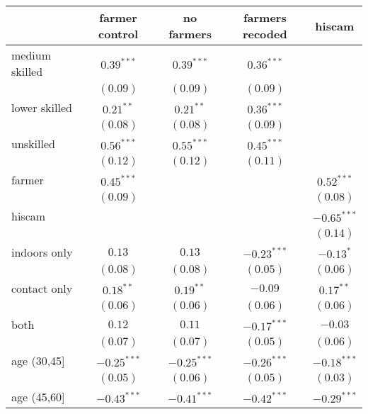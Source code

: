 
\begin{table}
\begin{center}
\begin{tabular}{l c c c c}
\hline
 & farmer control & no farmers & farmers recoded & hiscam \\
\hline
medium skilled & $0.39^{***}$  & $0.39^{***}$  & $0.36^{***}$  &               \\
               & $(0.09)$      & $(0.09)$      & $(0.09)$      &               \\
lower skilled  & $0.21^{**}$   & $0.21^{**}$   & $0.36^{***}$  &               \\
               & $(0.08)$      & $(0.08)$      & $(0.09)$      &               \\
unskilled      & $0.56^{***}$  & $0.55^{***}$  & $0.45^{***}$  &               \\
               & $(0.12)$      & $(0.12)$      & $(0.11)$      &               \\
farmer         & $0.45^{***}$  &               &               & $0.52^{***}$  \\
               & $(0.09)$      &               &               & $(0.08)$      \\
hiscam         &               &               &               & $-0.65^{***}$ \\
               &               &               &               & $(0.14)$      \\
indoors only   & $0.13$        & $0.13$        & $-0.23^{***}$ & $-0.13^{*}$   \\
               & $(0.08)$      & $(0.08)$      & $(0.05)$      & $(0.06)$      \\
contact only   & $0.18^{**}$   & $0.19^{**}$   & $-0.09$       & $0.17^{**}$   \\
               & $(0.06)$      & $(0.06)$      & $(0.06)$      & $(0.06)$      \\
both           & $0.12$        & $0.11$        & $-0.17^{***}$ & $-0.03$       \\
               & $(0.07)$      & $(0.07)$      & $(0.05)$      & $(0.06)$      \\
age (30,45]    & $-0.25^{***}$ & $-0.25^{***}$ & $-0.26^{***}$ & $-0.18^{***}$ \\
               & $(0.05)$      & $(0.06)$      & $(0.05)$      & $(0.03)$      \\
age (45,60]    & $-0.43^{***}$ & $-0.41^{***}$ & $-0.42^{***}$ & $-0.29^{***}$ \\

\end{tabular}
\end{center}
\end{table}
